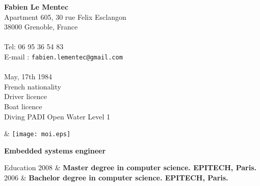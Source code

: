 \documentclass{resume}
\newcommand{\activite}[1]{\textbf{#1}\ }
\begin{document}
\begin{chapeau}
  \begin{adresse}
    \textbf{Fabien Le Mentec}\\
    Apartment 605, 30 rue Felix Esclangon \\
    38000 Grenoble, France	\\
    \ligne\\
    Tel: 06 95 36 54 83\\
    E-mail : \texttt{fabien.lementec@gmail.com}\\
    \ligne\\
    May, 17th 1984 \\
    French nationality \\
    Driver licence \\
    Boat licence \\
    Diving PADI Open Water Level 1
  \end{adresse}
  \begin{etatcivil}
    & \texttt{[image: moi.eps]}\\[2mm]
  \end{etatcivil}
\end{chapeau}

\vspace{0.4cm}

\begin{center}
  \textbf{\huge{Embedded systems engineer}}
\end{center}

\vspace{0.6cm}

\begin{rubriquetableau}[2cm]{Education}
  2008
  & \activite{\small{Master degree in computer science. EPITECH, Paris.}}
  \\[0.5mm]

  2006
  & \activite{\small{Bachelor degree in computer science. EPITECH, Paris.}}
  \\[0.5mm]

\end{rubriquetableau}

\vspace{0.6cm}
\end{document}
